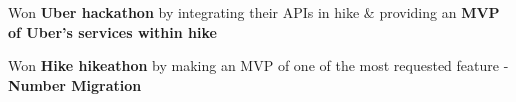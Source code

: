 
\begin{cventries}
  \cventry
    {} %
    {} %
    {} %
    {} %
    {
      \vspace{-6mm}
      \begin{cvitems} %
         \item {Won \textbf{Uber hackathon} by integrating their APIs in hike \& providing an \textbf{MVP of Uber's services within hike}}
         \item {Won \textbf{Hike hikeathon} by making an MVP of one of the most requested feature - \textbf{Number Migration}}
      \end{cvitems}
    }
\end{cventries}